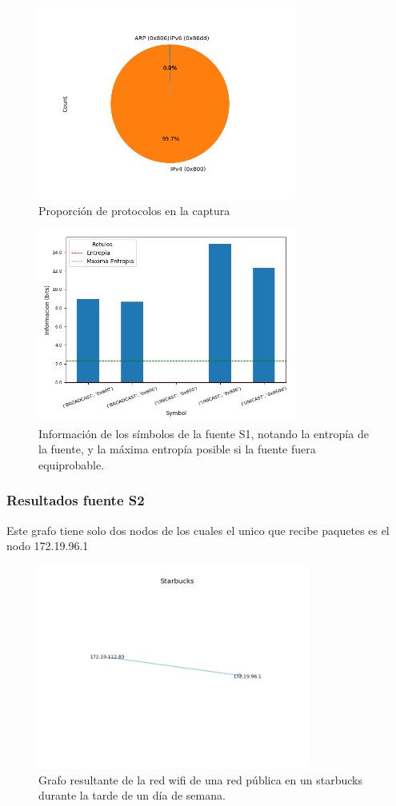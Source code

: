 \begin{figure}[H]
  \centering
  \includegraphics[width=8.5cm]{figs/protocols_proportion_starbucks_S1_output.png}
  \caption{\normalfont Proporción de protocolos en la captura}
\end{figure}

\begin{figure}[H]
  \centering
  \includegraphics[width=8.5cm]{figs/information_starbucks_S1_output.png}
  \caption{\normalfont Información de los símbolos de la fuente S1, notando la entropía de la fuente, y la máxima entropía posible si la fuente fuera equiprobable.}
\end{figure}

\subsubsection*{Resultados fuente S2}

Este grafo tiene solo dos nodos de los cuales el unico que recibe paquetes es el nodo 172.19.96.1

\begin{figure}[H]
 \centering
	\includegraphics[width=0.8\textwidth]{figs/starbucks.png}
	\caption{Grafo resultante de la red wifi de una red pública en un starbucks durante la tarde de un día de semana.}
	\label{fig:domicilio-grafo}
\end{figure}
